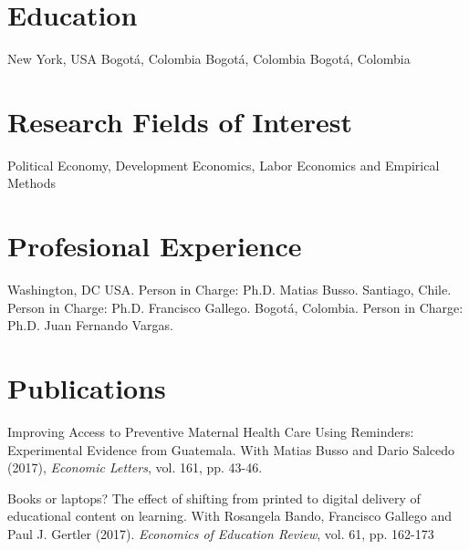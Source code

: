 \documentclass{moderncv}
\begin{document}
\maketitle
\section{\textbf{Education}}
 {New York, USA}{}{}
 {Bogot\'a, Colombia}{}{}
 {Bogot\'a, Colombia}{}{}
 {Bogot\'a, Colombia}{}{}

\section{\textbf{Research Fields of Interest}}
{Political Economy, Development Economics,  Labor Economics and Empirical Methods }

\section{\textbf{Profesional Experience}}
 {}{}{Washington, DC USA. Person in Charge: Ph.D. Matias Busso.}
 {}{}{Santiago, Chile. Person in Charge: Ph.D. Francisco Gallego.}
 {}{}{Bogot\'a, Colombia. Person in Charge: Ph.D. Juan Fernando Vargas.}

\section{\textbf{Publications}}

{Improving Access to Preventive Maternal Health Care Using Reminders: Experimental Evidence from Guatemala. With Matias Busso and Dario Salcedo (2017), \emph{Economic Letters}, vol. 161, pp. 43-46.\\} 

{Books or laptops? The effect of shifting from printed to digital delivery of educational content on learning. With Rosangela Bando, Francisco Gallego and Paul J. Gertler (2017). \emph{Economics of Education Review}, vol. 61, pp. 162-173\\} 
\end{document}
